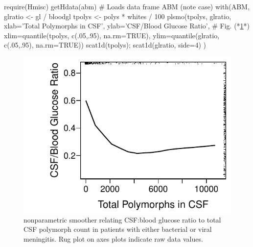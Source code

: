 \begin{Schunk}
\begin{Sinput}
require(Hmisc)
getHdata(abm)   # Loads data frame ABM (note case)
with(ABM, {
  glratio <- gl / bloodgl
  tpolys <- polys * whites / 100
  plsmo(tpolys, glratio, xlab='Total Polymorphs in CSF',
       ylab='CSF/Blood Glucose Ratio',    # Fig. (*\ref{fig:reg-glratio}*)
       xlim=quantile(tpolys,  c(.05,.95), na.rm=TRUE),
       ylim=quantile(glratio, c(.05,.95), na.rm=TRUE))
 scat1d(tpolys); scat1d(glratio, side=4) })
\end{Sinput}
\begin{figure}[htbp]

\centerline{\includegraphics[width=\maxwidth]{reg-glratio-1} }

\caption[ nonparametric smoother for glucose ratio]{ nonparametric smoother relating CSF:blood glucose ratio to total CSF polymorph count in patients with either bacterial or viral meningitis.  Rug plot on axes plots indicate raw data values.}\label{fig:reg-glratio}
\end{figure}
\end{Schunk}
